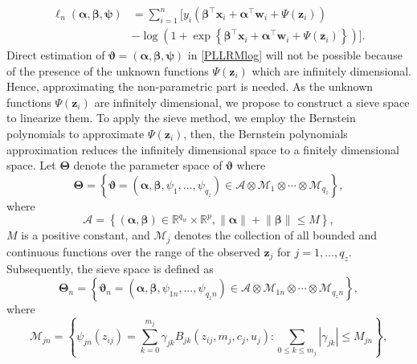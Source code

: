 \documentclass[11pt]{article}
\begin{document}
\begin{equation}\label{PLLRMlog}
\begin{split}
\ell_n(\boldsymbol{\alpha},\boldsymbol{\beta},\boldsymbol{\psi}) & = \sum^n_{i=1}  \big[y_i \left(\boldsymbol{\beta}^\top \textbf{x}_i + \boldsymbol{\alpha}^\top \textbf{w}_i + \Psi(\textbf{z}_i)\right) \\ 
& - \log\left(1+ \exp\left\{\boldsymbol{\beta}^\top \textbf{x}_i + \boldsymbol{\alpha}^\top \textbf{w}_i + \Psi(\textbf{z}_i) \right\}\right)\big].
\end{split}
\end{equation}
Direct estimation of $\boldsymbol{\vartheta} = (\boldsymbol{\alpha}, \boldsymbol{\beta}, \boldsymbol{\psi})$ in \eqref{PLLRMlog} will not be possible because of the presence of the unknown functions $\Psi(\textbf{z}_i)$ which are infinitely dimensional. Hence, approximating the non-parametric part is needed. As the unknown functions $\Psi(\textbf{z}_i)$ are infinitely dimensional, we propose to construct a sieve space to linearize them. To apply the sieve method, we employ the Bernstein polynomials to approximate $\Psi(\textbf{z}_i)$, then, the Bernstein polynomials approximation reduces the infinitely dimensional space to a finitely dimensional space. Let $\boldsymbol{\Theta}$ denote the parameter space of $\boldsymbol{\vartheta}$ where
$$
\boldsymbol{\Theta} = \left\{ \boldsymbol{\vartheta}=\left(\boldsymbol{\alpha},\boldsymbol{\beta},\psi_1,\ldots,\psi_{q_z}\right) \in \mathcal{A} \otimes \mathcal{M}_1 \otimes \cdots \otimes \mathcal{M}_{q_z}\right\},
$$
where 
$$
\mathcal{A} = \left\{\left(\boldsymbol{\alpha}, \boldsymbol{\beta}\right) \in \mathbb{R}^{q_w} \times \mathbb{R}^p, \left\lVert \boldsymbol{\alpha}\right\rVert + \left\lVert \boldsymbol{\beta}\right\rVert \leq M \right\},
$$
$M$ is a positive constant, and $\mathcal{M}_j$ denotes the collection of all bounded and continuous functions over the range of the observed $\textbf{z}_j$ for $j=1,\ldots,q_z$. Subsequently, the sieve space is defined as
$$
\boldsymbol{\Theta}_n = \left\{\boldsymbol{\vartheta}_n = \left(\boldsymbol{\alpha},\boldsymbol{\beta},\psi_{1n},\ldots,\psi_{q_{z}n}\right) \in \mathcal{A} \otimes \mathcal{M}_{1n} \otimes \cdots \otimes \mathcal{M}_{q_{z}n}\right\},
$$
where
\begin{equation}\label{approx}
\mathcal{M}_{jn} = \left\{ \psi_{jn} (z_{ij}) = \sum^{m_j}_{k=0} \gamma_{jk} B_{jk} (z_{ij}, m_j, c_j, u_j) : \sum_{0 \leq k \leq m_j} |\gamma_{jk}| \leq M_{jn} \right\},
\end{equation}
\end{document}
